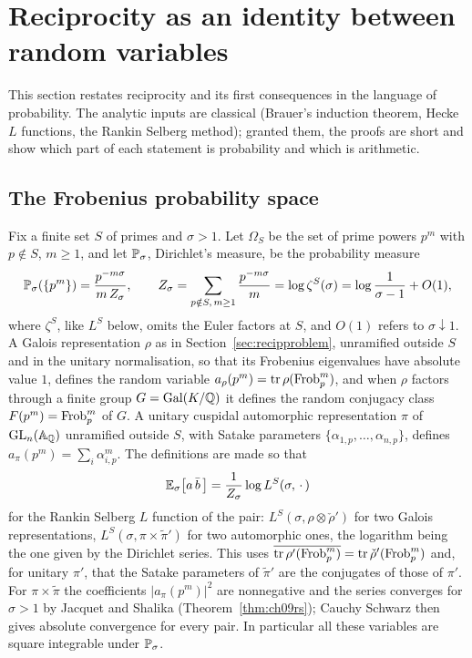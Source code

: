 \section{Reciprocity as an identity between random variables}\label{sec:reciplaw}

This section restates reciprocity and its first consequences in the language of probability. The analytic inputs are classical (Brauer's induction theorem, Hecke $L$ functions, the Rankin Selberg method); granted them, the proofs are short and show which part of each statement is probability and which is arithmetic.

\subsection{The Frobenius probability space}

Fix a finite set $S$ of primes and $\sigma>1$. Let $\Omega_S$ be the set of prime powers $p^m$ with $p\notin S$, $m\ge1$, and let $\mathbb{P}_\sigma$, Dirichlet's measure, be the probability measure
\[
\mathbb{P}_\sigma(\{p^m\})=\frac{p^{-m\sigma}}{m\,Z_\sigma},\qquad Z_\sigma=\sum_{p\notin S,\,m\ge1}\frac{p^{-m\sigma}}m=\log\zeta^S(\sigma)=\log\frac1{\sigma-1}+O(1),
\]
where $\zeta^S$, like $L^S$ below, omits the Euler factors at $S$, and $O(1)$ refers to $\sigma\downarrow1$. A Galois representation $\rho$ as in Section~\ref{sec:recipproblem}, unramified outside $S$ and in the unitary normalisation, so that its Frobenius eigenvalues have absolute value $1$, defines the random variable $a_\rho(p^m)=\operatorname{tr}\rho(\operatorname{Frob}_p^m)$, and when $\rho$ factors through a finite group $G=\operatorname{Gal}(K/\mathbb{Q})$ it defines the random conjugacy class $F(p^m)=\operatorname{Frob}_p^m$ of $G$. A unitary cuspidal automorphic representation $\pi$ of $\mathrm{GL}_n(\mathbb{A}_{\mathbb{Q}})$ unramified outside $S$, with Satake parameters $\{\alpha_{1,p},\dots,\alpha_{n,p}\}$, defines $a_\pi(p^m)=\sum_i\alpha_{i,p}^m$. The definitions are made so that
\begin{equation}\label{eq:reciplogL}
\mathbb{E}_\sigma\bigl[a\,\bar b\,\bigr]=\frac1{Z_\sigma}\log L^S(\sigma,\,\cdot\,)
\end{equation}
for the Rankin Selberg $L$ function of the pair: $L^S(\sigma,\rho\otimes\check\rho')$ for two Galois representations, $L^S(\sigma,\pi\times\tilde\pi')$ for two automorphic ones, the logarithm being the one given by the Dirichlet series. This uses $\overline{\operatorname{tr}\rho'(\operatorname{Frob}_p^m)}=\operatorname{tr}\check\rho'(\operatorname{Frob}_p^m)$ and, for unitary $\pi'$, that the Satake parameters of $\tilde\pi'$ are the conjugates of those of $\pi'$. For $\pi\times\tilde\pi$ the coefficients $|a_\pi(p^m)|^2$ are nonnegative and the series converges for $\sigma>1$ by Jacquet and Shalika \cite{jacquetshalika1981} (Theorem~\ref{thm:ch09rs}); Cauchy Schwarz then gives absolute convergence for every pair. In particular all these variables are square integrable under $\mathbb{P}_\sigma$.

